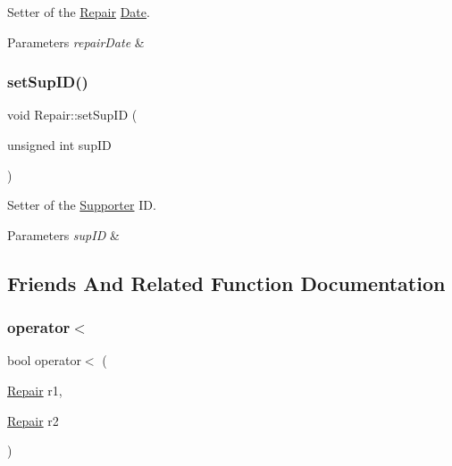 Setter of the \mbox{\hyperlink{class_repair}{Repair}} \mbox{\hyperlink{class_date}{Date}}. 


\begin{DoxyParams}{Parameters}
{\em repair\+Date} & \\
\hline
\end{DoxyParams}
\mbox{\label{class_repair_a22397013bb177a54a104cabdbb578900}} 
\subsubsection{\texorpdfstring{set\+Sup\+I\+D()}{setSupID()}}
{\footnotesize\ttfamily void Repair\+::set\+Sup\+ID (\begin{DoxyParamCaption}\item[{unsigned int}]{sup\+ID }\end{DoxyParamCaption})}



Setter of the \mbox{\hyperlink{class_supporter}{Supporter}} ID. 


\begin{DoxyParams}{Parameters}
{\em sup\+ID} & \\
\hline
\end{DoxyParams}


\subsection{Friends And Related Function Documentation}
\mbox{\label{class_repair_ab74b8c54a490123a54720449488f95e8}} 
\subsubsection{\texorpdfstring{operator$<$}{operator<}}
{\footnotesize\ttfamily bool operator$<$ (\begin{DoxyParamCaption}\item[{\mbox{\hyperlink{class_repair}{Repair}}}]{r1,  }\item[{\mbox{\hyperlink{class_repair}{Repair}}}]{r2 }\end{DoxyParamCaption})\hspace{0.3cm}{\ttfamily [friend]}}



